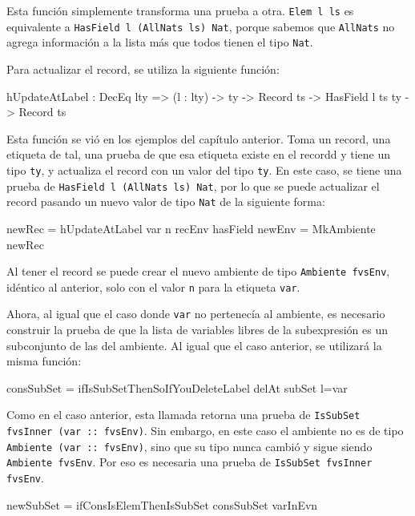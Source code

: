 Esta función simplemente transforma una prueba a otra. \texttt{Elem l ls} es equivalente a \texttt{HasField l (AllNats ls) Nat}, porque sabemos que \texttt{AllNats} no agrega información a la lista más que todos tienen el tipo \texttt{Nat}.

Para actualizar el record, se utiliza la siguiente función:

\begin{code}
hUpdateAtLabel : DecEq lty => (l : lty) ->
  ty -> Record ts -> HasField l ts ty -> Record ts
\end{code}

Esta función se vió en los ejemplos del capítulo anterior. Toma un record, una etiqueta de tal, una prueba de que esa etiqueta existe en el recordd y tiene un tipo \texttt{ty}, y actualiza el record con un valor del tipo \texttt{ty}. En este caso, se tiene una prueba de \texttt{HasField l (AllNats ls) Nat}, por lo que se puede actualizar el record pasando un nuevo valor de tipo \texttt{Nat} de la siguiente forma:

\begin{code}
newRec = hUpdateAtLabel var n recEnv hasField
newEnv = MkAmbiente newRec
\end{code}

Al tener el record se puede crear el nuevo ambiente de tipo \texttt{Ambiente fvsEnv}, idéntico al anterior, solo con el valor \texttt{n} para la etiqueta \texttt{var}.

Ahora, al igual que el caso donde \texttt{var} no pertenecía al ambiente, es necesario construir la prueba de que la lista de variables libres de la subexpresión es un subconjunto de las del ambiente. Al igual que el caso anterior, se utilizará la misma función:

\begin{code}
consSubSet =
  ifIsSubSetThenSoIfYouDeleteLabel delAt subSet {l=var}
\end{code}

Como en el caso anterior, esta llamada retorna una prueba de \texttt{IsSubSet fvsInner (var :: fvsEnv)}. Sin embargo, en este caso el ambiente no es de tipo \texttt{Ambiente (var :: fvsEnv)}, sino que su tipo nunca cambió y sigue siendo \texttt{Ambiente fvsEnv}. Por eso es necesaria una prueba de \texttt{IsSubSet fvsInner fvsEnv}.

\begin{code}
newSubSet = ifConsIsElemThenIsSubSet consSubSet varInEvn
\end{code}


